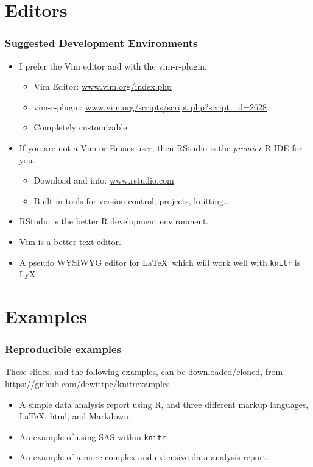 \documentclass[t]{beamer}\usepackage[]{graphicx}\usepackage[]{color}
\begin{document}
\section{Editors} 
\begin{frame}
  \frametitle{Suggested Development Environments}

  \begin{itemize}
    \item I prefer the Vim editor and with the vim-r-plugin.  
      \begin{itemize}
        \item Vim Editor: \url{www.vim.org/index.php}
        \item vim-r-plugin: \url{www.vim.org/scripts/script.php?script\_id=2628} 
        \item Completely customizable.
      \end{itemize}

    \item If you are not a Vim or Emacs user, then RStudio is the \emph{premier}
      R IDE for you.
      \begin{itemize}
        \item Download and info: \url{www.rstudio.com}

        \item Built in tools for version control, projects, knitting\ldots
      \end{itemize}


    \item RStudio is the better R development environment.  
    \item Vim is a better text editor.

    \item A pseudo WYSIWYG editor for \LaTeX\ which will work well with 
      {\tt knitr} is LyX.
      
  \end{itemize}
\end{frame}

\section{Examples}
\begin{frame}
  \frametitle{Reproducible examples}
  These slides, and the following examples, can be downloaded/cloned, from
  \url{https://github.com/dewittpe/knitrexamples}

  \begin{itemize}
    \item A simple data analysis report using R, and three different markup
      languages, \LaTeX, html, and Markdown.
    \item An example of using SAS within {\tt knitr}.
    \item An example of a more complex and extensive data analysis report.
  \end{itemize}
\end{frame}
\end{document}
